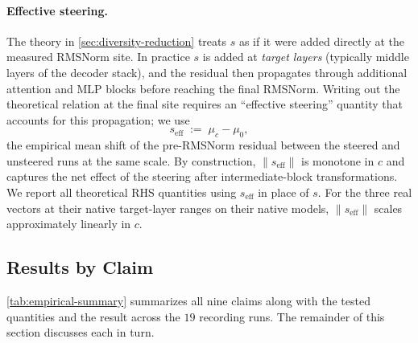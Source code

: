 \paragraph{Effective steering.} The theory in \ref{sec:diversity-reduction} treats $s$ as if it were added directly at the measured RMSNorm site. In practice $s$ is added at \emph{target layers} (typically middle layers of the decoder stack), and the residual then propagates through additional attention and MLP blocks before reaching the final RMSNorm. Writing out the theoretical relation at the final site requires an ``effective steering'' quantity that accounts for this propagation; we use
\[
  s_{\mathrm{eff}} \;:=\; \mu_c - \mu_0,
\]
the empirical mean shift of the pre-RMSNorm residual between the steered and unsteered runs at the same scale. By construction, $\|s_\mathrm{eff}\|$ is monotone in $c$ and captures the net effect of the steering after intermediate-block transformations. We report all theoretical RHS quantities using $s_\mathrm{eff}$ in place of $s$. For the three real vectors at their native target-layer ranges on their native models, $\|s_\mathrm{eff}\|$ scales approximately linearly in $c$.

\subsection{Results by Claim}
\label{sec:empirical-results}

\ref{tab:empirical-summary} summarizes all nine claims along with the tested quantities and the result across the $19$ recording runs. The remainder of this section discusses each in turn.

